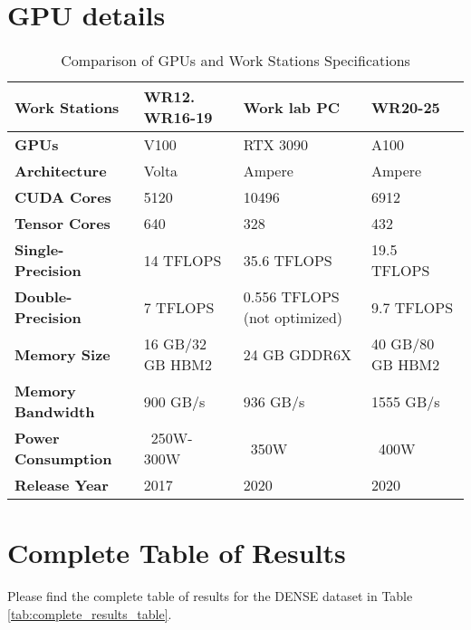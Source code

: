 \documentclass[report.tex]{subfiles}
\begin{document}
    \chapter{GPU details}
    \label{appendix:gpu_details}

    \begin{table}[h]
        \centering
        \caption{Comparison of GPUs and Work Stations Specifications}
        \begin{tabular}{|l|l|l|l|}
        \hline
        \textbf{Work Stations} & \textbf{WR12. WR16-19} & \textbf{Work lab PC} & \textbf{WR20-25} \\ \hline
        \textbf{GPUs} & V100 & RTX 3090 & A100 \\ \hline
        \textbf{Architecture} & Volta & Ampere & Ampere \\ \hline
        \textbf{CUDA Cores} & 5120 & 10496 & 6912 \\ \hline
        \textbf{Tensor Cores} & 640 & 328 & 432 \\ \hline
        \textbf{Single-Precision} & 14 TFLOPS & 35.6 TFLOPS & 19.5 TFLOPS \\ \hline
        \textbf{Double-Precision} & 7 TFLOPS & 0.556 TFLOPS (not optimized) & 9.7 TFLOPS \\ \hline
        \textbf{Memory Size} & 16 GB/32 GB HBM2 & 24 GB GDDR6X & 40 GB/80 GB HBM2 \\ \hline
        \textbf{Memory Bandwidth} & 900 GB/s & 936 GB/s & 1555 GB/s \\ \hline
        \textbf{Power Consumption} & ~250W-300W & ~350W & ~400W \\ \hline
        \textbf{Release Year} & 2017 & 2020 & 2020 \\ \hline
        \end{tabular}
        
        \label{tab:gpu_comparison}
    \end{table}
    
    


    \chapter{Complete Table of Results}

    Please find the complete table of results for the DENSE dataset in Table \ref{tab:complete_results_table}.
\end{document}
